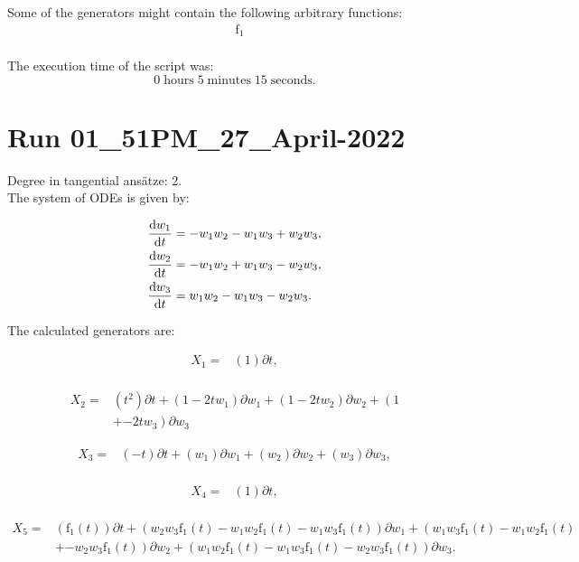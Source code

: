 \noindent Some of the generators might contain the following arbitrary functions:
\begin{align*}
&\operatorname{f_{1}}\\
\end{align*}

\noindent The execution time of the script was:
$$0\;\mathrm{hours}\;5\;\mathrm{minutes}\;15 \;\mathrm{seconds}.$$
\section*{Run 01\_51PM\_27\_April-2022}
Degree in tangential ansätze:	2.\\
The system of ODEs is given by:

\begin{align*}
\dv{w_{1}}{t}&=- w_{1} w_{2} - w_{1} w_{3} + w_{2} w_{3},\\
\dv{w_{2}}{t}&=- w_{1} w_{2} + w_{1} w_{3} - w_{2} w_{3},\\
\dv{w_{3}}{t}&=w_{1} w_{2} - w_{1} w_{3} - w_{2} w_{3}.\\
\end{align*}

\noindent The calculated generators are:

\begin{align*}
X_{1}=&\left(1 \right)\partial t,\\
\end{align*}

\begin{align*}
X_{2}=&\left(t^{2} \right)\partial t+\left(1- 2 t w_{1} \right)\partial w_{1}+\left(1- 2 t w_{2} \right)\partial w_{2}+\left(1\right.\\
&+\left.- 2 t w_{3} \right)\partial w_{3}
\end{align*}

\begin{align*}
X_{3}=&\left(- t \right)\partial t+\left(w_{1} \right)\partial w_{1}+\left(w_{2} \right)\partial w_{2}+\left(w_{3} \right)\partial w_{3},\\
\end{align*}

\begin{align*}
X_{4}=&\left(1 \right)\partial t,\\
\end{align*}

\begin{align*}
X_{5}=&\left(\operatorname{f_{1}}{\left(t \right)} \right)\partial t+\left(w_{2} w_{3} \operatorname{f_{1}}{\left(t \right)}- w_{1} w_{2} \operatorname{f_{1}}{\left(t \right)}- w_{1} w_{3} \operatorname{f_{1}}{\left(t \right)} \right)\partial w_{1}+\left(w_{1} w_{3} \operatorname{f_{1}}{\left(t \right)}- w_{1} w_{2} \operatorname{f_{1}}{\left(t \right)}\right.\\
&+\left.- w_{2} w_{3} \operatorname{f_{1}}{\left(t \right)} \right)\partial w_{2}+\left(w_{1} w_{2} \operatorname{f_{1}}{\left(t \right)} - w_{1} w_{3} \operatorname{f_{1}}{\left(t \right)} - w_{2} w_{3} \operatorname{f_{1}}{\left(t \right)} \right)\partial w_{3}.\\
\end{align*}



